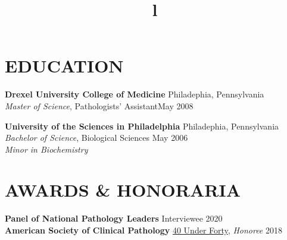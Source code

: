 \documentclass[margin]{res}
\begin{document}
\begin{resume}

\section{EDUCATION}
\textbf{Drexel University College of Medicine} Philadephia, Pennsylvania\\
{\sl Master of Science}, Pathologists' Assistant\hfill May 2008
\par
\textbf{University of the Sciences in Philadelphia} Philadephia, Pennsylvania\\
{\sl Bachelor of Science}, Biological Sciences \hfill
May 2006
\\
\emph{Minor in Biochemistry}

\section{AWARDS \& HONORARIA}
\textbf{Panel of National Pathology Leaders} Interviewee \hfill 2020 \\
\textbf{American Society of Clinical Pathology} \underline{40 Under Forty}, \emph{Honoree} \hfill 2018




\begin{format}
\title{l}\\

\\
\\
\body
\end{format}

\end{resume}
\end{document}
